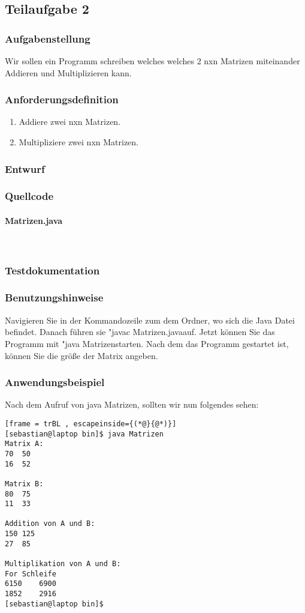 \subsection{Teilaufgabe 2}
\subsubsection{Aufgabenstellung}
Wir sollen ein Programm schreiben welches welches 2 nxn Matrizen miteinander Addieren und Multiplizieren kann.

\subsubsection{Anforderungsdefinition}
\begin{enumerate}
	\item Addiere zwei nxn Matrizen.
	\item Multipliziere zwei nxn Matrizen.
\end{enumerate}

\subsubsection{Entwurf}

\subsubsection{Quellcode}
\paragraph{Matrizen.java}\


\subsubsection{Testdokumentation}

\subsubsection{Benutzungshinweise}
Navigieren Sie in der Kommandozeile zum dem Ordner, wo sich die Java Datei befindet.
Danach führen sie "javac Matrizen.java\dq \space auf. Jetzt können Sie das Programm mit
"java Matrizen\dq \space starten. Nach dem das Programm gestartet ist, können Sie die
grö\ss e der Matrix angeben.

\subsubsection{Anwendungsbeispiel}
Nach dem Aufruf von java Matrizen, sollten wir nun folgendes sehen:
\begin{lstlisting}[frame = trBL , escapeinside={(*@}{@*)}]
[sebastian@laptop bin]$ java Matrizen
Matrix A:
70	50	
16	52	

Matrix B:
80	75	
11	33	

Addition von A und B:
150	125	
27	85	

Multiplikation von A und B:
For Schleife
6150	6900	
1852	2916
[sebastian@laptop bin]$  
\end{lstlisting}
